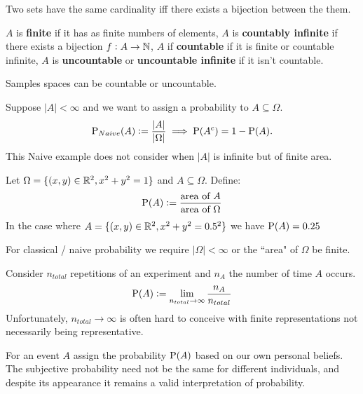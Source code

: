 \begin{definition}
    Two sets have the same cardinality iff there exists a bijection between the them.
\end{definition}

\begin{definition}
    $A$ is \textbf{finite} if it has as finite numbers of elements, $A$ is \textbf{countably infinite} if there exists a bijection $f: A \to \NN$, $A$ if \textbf{countable} if it is finite or countable infinite, $A$ is \textbf{uncountable} or \textbf{uncountable infinite} if it isn't countable.
\end{definition}

Samples spaces can be countable or uncountable.

\begin{definition}
    Suppose $|A| < \infty$ and we want to assign a probability to $A \subseteq \Omega$.
    \[
    \P_{Naive}(A) := \frac{|A|}{|\Omega|} \implies \P(A^c) = 1 - \P(A)  \textcolor{black}{.}
    \]
    This Naive example does not consider when $|A|$ is infinite but of finite area.
\end{definition}
\begin{example}
    Let $\Omega = \{(x,y) \in \RR^2, x^2+y^2=1\}$ and $A\subseteq\Omega$. Define: 
    \[
    \P(A) := \frac{\text{area of } A}{\text{area of } \Omega}
    \]
    In the case where $A = \{(x,y) \in \RR^2, x^2+y^2=0.5^2\}$ we have $\P(A) = 0.25$
\end{example}
\begin{remark}
    For classical / naive probability we require $|\Omega| < \infty$ or the ``area" of $\Omega$ be finite. 
\end{remark}

\begin{definition}
    Consider $n_{total}$ repetitions of an experiment and $n_A$ the number of time $A$ occurs.
    \[\P(A) := \lim_{n_{total} \to \infty} \frac{n_A}{n_{total}}\]
    Unfortunately, $n_{total} \to \infty$ is often hard to conceive with finite representations not necessarily being representative.
\end{definition}

\begin{definition}
    For an event $A$ assign the probability $\P(A)$ based on our own personal beliefs. The subjective probability need not be the same for different individuals, and despite its appearance it remains a valid interpretation of probability.
\end{definition}

